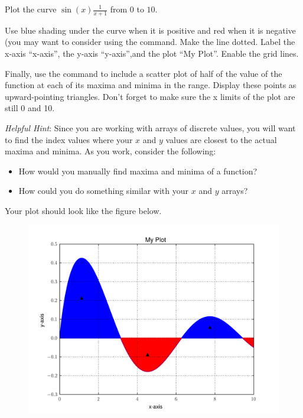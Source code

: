 \begin{problem} Plot the curve $\sin(x)\frac{1}{x+1}$ from $0$ to $10$.

Use blue shading under the curve when it is positive and red when it is negative (you may want to consider using the  command.
Make the line dotted.
Label the x-axis ``x-axis'', the y-axis ``y-axis'',and the plot ``My Plot''.
Enable the grid lines.

Finally, use the  command to include a scatter plot of half of the value of the function at each of its maxima and minima in the range.
Display these points as upward-pointing triangles.
Don't forget to make sure the x limits of the plot are still 0 and 10.

\emph{Helpful Hint}: Since you are working with arrays of discrete values, you will want to find the index values where your $x$ and $y$ values are closest to the actual maxima and minima. As you work, consider the following:
\begin{itemize}
\item How would you manually find maxima and minima of a function?
\item How could you do something similar with your $x$ and $y$ arrays?
\end{itemize}
Your plot should look like the figure below.

\begin{figure}[H]
\includegraphics[width=\textwidth]{soln3.pdf}
\label{fig:problem3}
\end{figure}
\end{problem}

